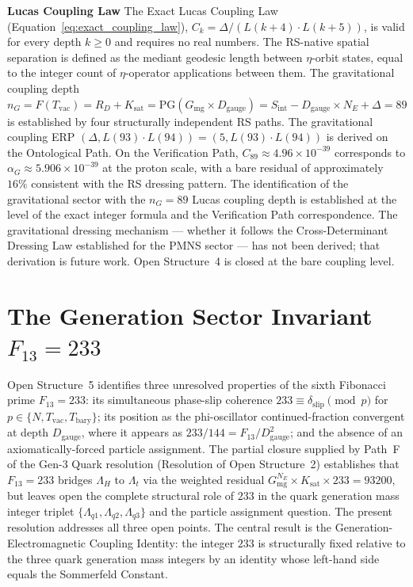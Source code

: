 \documentclass[11pt, letterpaper]{article}
\theoremstyle{definition}
\theoremstyle{plain}
\begin{document}
\begin{rsbox}
\textbf{Lucas Coupling Law}
The Exact Lucas Coupling Law
(Equation~\eqref{eq:exact_coupling_law}),
$C_k = \Delta / (L(k+4) \cdot L(k+5))$, is valid for every depth $k \geq 0$ and
requires no real numbers. The RS-native spatial separation is defined as the
mediant geodesic length between $\eta$-orbit states, equal to the integer count of
$\eta$-operator applications between them. The gravitational coupling depth
$n_G = F(T_\mathrm{vac}) = R_D + K_\mathrm{sat} = \mathrm{PG}(G_\mathrm{mg} \times
D_\mathrm{gauge}) = S_\mathrm{int} - D_\mathrm{gauge} \times N_E + \Delta = 89$
is established by four structurally independent RS paths. The gravitational coupling
ERP $(\Delta, L(93) \cdot L(94)) = (5, L(93) \cdot L(94))$ is derived on the
Ontological Path. On the Verification Path, $C_{89} \approx 4.96 \times 10^{-39}$
corresponds to $\alpha_G \approx 5.906 \times 10^{-39}$ at the proton scale, with
a bare residual of approximately $16\%$ consistent with the RS dressing pattern.
The identification of the gravitational sector with the $n_G = 89$ Lucas coupling
depth is established at the level of the exact integer formula and the Verification
Path correspondence. The gravitational dressing mechanism — whether it follows the
Cross-Determinant Dressing Law established for the PMNS sector — has not been
derived; that derivation is future work. Open Structure~4 is closed at the bare
coupling level.
\end{rsbox}


\section{The Generation Sector Invariant $F_{13} = 233$}\label{sec:gen-sector-invariant-section}

Open Structure~5 identifies three unresolved properties of the sixth Fibonacci prime
$F_{13} = 233$: its simultaneous phase-slip coherence $233 \equiv \delta_\mathrm{slip}
\pmod{p}$ for $p \in \{N, T_\mathrm{vac}, T_\mathrm{bary}\}$; its position as the
phi-oscillator continued-fraction convergent at depth $D_\mathrm{gauge}$, where it
appears as $233/144 = F_{13}/D_\mathrm{gauge}^2$; and the absence of an
axiomatically-forced particle assignment. The partial closure supplied by Path~F of
the Gen-3 Quark resolution (Resolution of Open Structure~2) establishes that $F_{13}
= 233$ bridges $\Lambda_H$ to $\Lambda_t$ via the weighted residual
$G_\mathrm{mg}^{N_E} \times K_\mathrm{sat} \times 233 = 93200$, but leaves open
the complete structural role of $233$ in the quark generation mass integer triplet
$\{\Lambda_{q1}, \Lambda_{q2}, \Lambda_{q3}\}$ and the particle assignment question.
The present resolution addresses all three open points.
The central result is the Generation-Electromagnetic Coupling Identity:
the integer $233$ is structurally fixed relative to the three quark generation mass
integers by an identity whose left-hand side equals the Sommerfeld Constant.
\end{document}

